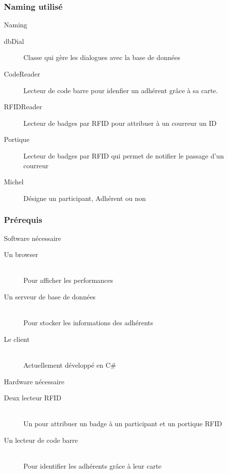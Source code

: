 \documentclass[10pt,handout,usepdftitle=false,envcountsect]{beamer}
\begin{document}
\begin{frame}
\frametitle{Naming utilisé}
\begin{block}{Naming}
\begin{description}
\item[dbDial] Classe qui gère les dialogues avec la base de données
    \newline
\item[CodeReader] Lecteur de code barre pour idenfier un adhérent grâce à sa carte.
    \newline
\item[RFIDReader] Lecteur de badges par RFID pour attribuer à un courreur un ID
    \newline
\item[Portique] Lecteur de badges par RFID qui permet de notifier le passage d'un courreur
    \newline
\item[Michel] Désigne un participant, Adhérent ou non
\end{description}
\end{block}
\end{frame}

\begin{frame}
\frametitle{Prérequis}

\begin{block}{Software nécessaire}

\begin{description}
\item[Un browser] \hfill \\Pour afficher les performances
\item[Un serveur de base de données] \hfill \\Pour stocker les informations des adhérents
\item[Le client] \hfill \\Actuellement développé en C\#
\end{description}
\end{block}

\begin{block}{Hardware nécessaire}

\begin{description}
\item[Deux lecteur RFID] \hfill \\Un pour attribuer un badge à un participant et un portique RFID
\item[Un lecteur de code barre] \hfill \\Pour identifier les adhérents grâce à leur carte
\end{description}
\end{block}

\end{frame}
\end{document}
